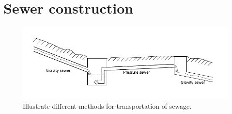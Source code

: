 \section{Sewer construction}\label{se:sewer_construction}

\begin{figure}[H]
\centering
\includegraphics[width=1\textwidth]{report/introduction/pictures/Sewer_drawing.pdf}
\caption{Illustrate different methods for transportation of sewage.}
\label{fig:stepresponses_simulinkgensetmodel}
\end{figure}